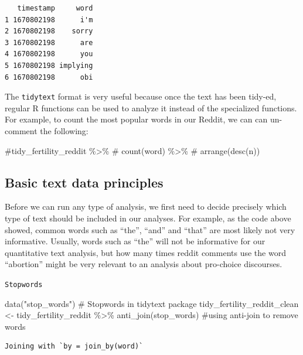 \documentclass[
  letterpaper,
  DIV=11,
  numbers=noendperiod]{scrreprt}
\newenvironment{Shaded}{\begin{snugshade}}{\end{snugshade}}
\newcommand{\CommentTok}[1]{\textcolor[rgb]{0.37,0.37,0.37}{#1}}
\newcommand{\FunctionTok}[1]{\textcolor[rgb]{0.28,0.35,0.67}{#1}}
\newcommand{\NormalTok}[1]{\textcolor[rgb]{0.00,0.23,0.31}{#1}}
\newcommand{\OtherTok}[1]{\textcolor[rgb]{0.00,0.23,0.31}{#1}}
\newcommand{\SpecialCharTok}[1]{\textcolor[rgb]{0.37,0.37,0.37}{#1}}
\newcommand{\StringTok}[1]{\textcolor[rgb]{0.13,0.47,0.30}{#1}}
\begin{document}
\begin{verbatim}
   timestamp     word
1 1670802198      i'm
2 1670802198    sorry
3 1670802198      are
4 1670802198      you
5 1670802198 implying
6 1670802198      obi
\end{verbatim}

The \texttt{tidytext} format is very useful because once the text has
been tidy-ed, regular R functions can be used to analyze it instead of
the specialized functions. For example, to count the most popular words
in our Reddit, we can can un-comment the following:

\begin{Shaded}
\begin{Highlighting}[]
\CommentTok{\#tidy\_fertility\_reddit \%\textgreater{}\%}
\CommentTok{\#  count(word) \%\textgreater{}\%}
\CommentTok{\#  arrange(desc(n))}
\end{Highlighting}
\end{Shaded}

\hypertarget{basic-text-data-principles-1}{%
\subsection{Basic text data
principles}\label{basic-text-data-principles-1}}

Before we can run any type of analysis, we first need to decide
precisely which type of text should be included in our analyses. For
example, as the code above showed, common words such as ``the'', ``and''
and ``that'' are most likely not very informative. Usually, words such
as ``the'' will not be informative for our quantitative text analysis,
but how many times reddit comments use the word ``abortion'' might be
very relevant to an analysis about pro-choice discourses.

\texttt{Stopwords}

\begin{Shaded}
\begin{Highlighting}[]
\FunctionTok{data}\NormalTok{(}\StringTok{"stop\_words"}\NormalTok{) }\CommentTok{\# Stopwords in tidytext package }
\NormalTok{tidy\_fertility\_reddit\_clean }\OtherTok{\textless{}{-}}\NormalTok{ tidy\_fertility\_reddit }\SpecialCharTok{\%\textgreater{}\%}
  \FunctionTok{anti\_join}\NormalTok{(stop\_words) }\CommentTok{\#using anti{-}join to remove words}
\end{Highlighting}
\end{Shaded}

\begin{verbatim}
Joining with `by = join_by(word)`
\end{verbatim}
\end{document}
